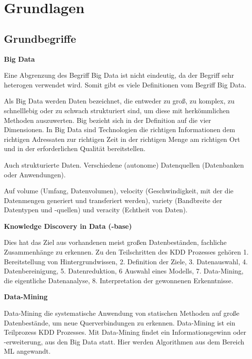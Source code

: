 \chapter{Grundlagen}
\section{Grundbegriffe}

\textbf{Big Data}\vspace{0.2cm}

Eine Abgrenzung des Begriff Big Data ist nicht eindeutig, da der Begriff sehr heterogen verwendet wird. Somit gibt es viele Definitionen vom Begriff Big Data.\vspace{0.2cm}

Als Big Data werden Daten bezeichnet, die entweder zu groß, zu komplex, zu schnelllebig oder zu schwach strukturiert sind, um diese mit herkömmlichen Methoden auszuwerten. Big bezieht sich in der Definition auf die vier Dimensionen. In Big Data sind Technologien die richtigen Informationen dem richtigen Adressaten zur richtigen Zeit in der richtigen Menge am richtigen Ort und in der erforderlichen Qualität bereitstellen.\vspace{0.2cm}

Auch strukturierte Daten. Verschiedene (autonome) Datenquellen (Datenbanken oder Anwendungen).\vspace{0.2cm}

Auf volume (Umfang, Datenvolumen), velocity (Geschwindigkeit, mit der die Datenmengen generiert und transferiert werden), variety (Bandbreite der Datentypen und -quellen) und veracity (Echtheit von Daten).\vspace{0.5cm}

\textbf{Knowledge Discovery in Data (-base)}\vspace{0.2cm}

Dies hat das Ziel aus vorhandenen meist großen Datenbeständen, fachliche Zusammenhänge zu erkennen. Zu den Teilschritten des KDD Prozesses gehören 1. Bereitstellung von Hintergrundwissen, 2. Definition der Ziele, 3. Datenauswahl, 4. Datenbereinigung, 5. Datenreduktion, 6 Auswahl eines Modells, 7. Data-Mining, die eigentliche Datenanalyse, 8. Interpretation der gewonnenen Erkenntnisse.\vspace{0.5cm}

\textbf{Data-Mining}\vspace{0.2cm}

Data-Mining die systematische Anwendung von statischen Methoden auf große Datenbestände, um neue Querverbindungen zu erkennen. Data-Mining ist ein Teilprozess KDD Prozesses. Mit Data-Mining findet ein Informationsgewinn oder -erweiterung, aus den Big Data statt. Hier werden Algorithmen aus dem Bereich ML angewandt.

